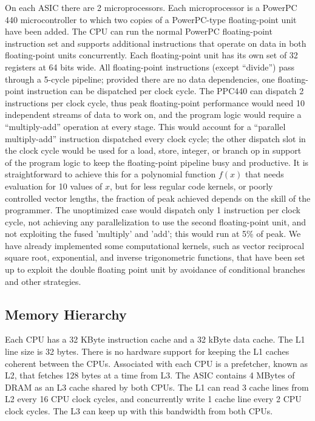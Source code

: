 \documentclass[doublespacing]{elsart}
\begin{document}
On each ASIC there are 2 microprocessors. Each microprocessor is a
PowerPC 440 microcontroller to which two copies of a PowerPC-type
floating-point unit have been added. The CPU can run the normal
PowerPC floating-point instruction set and supports additional
instructions that operate on data in both floating-point units
concurrently. Each floating-point unit has its own set of 32 registers
at 64 bits wide.  All floating-point instructions (except ``divide'')
pass through a 5-cycle pipeline; provided there are no data
dependencies, one floating-point instruction can be dispatched per
clock cycle.  The PPC440 can dispatch 2 instructions per clock cycle,
thus peak floating-point performance would need 10 independent streams
of data to work on, and the program logic would require a
``multiply-add'' operation at every stage. This would account for a
``parallel multiply-add'' instruction dispatched every clock cycle; the
other dispatch slot in the clock cycle would be used for a load,
store, integer, or branch op in support of the program logic to keep
the floating-point pipeline busy and productive.  It is
straightforward to achieve this for a polynomial function $f(x)$ that
needs evaluation for 10 values of $x$, but for less regular code
kernels, or poorly controlled vector lengths, the fraction of peak
achieved depends on the skill of the programmer.  The unoptimized case
would dispatch only 1 instruction per clock cycle, not achieving any
parallelization to use the second floating-point unit, and not
exploiting the fused 'multiply' and 'add'; this would run at 5\% of
peak.  We have already implemented some computational kernels, such as
vector reciprocal square root, exponential, and inverse trigonometric
functions, that have been set up to exploit the double floating point
unit by avoidance of conditional branches and other strategies.

\subsection{Memory Hierarchy}

Each CPU has a 32 KByte instruction cache and a 32 kByte data
cache. The L1 line size is 32 bytes. There is no hardware support for
keeping the L1 caches coherent between the CPUs.  Associated with each
CPU is a prefetcher, known as L2, that fetches 128 bytes at a time
from L3. The ASIC contains 4 MBytes of DRAM as an L3 cache shared by
both CPUs.  The L1 can read 3 cache lines from L2 every 16 CPU clock
cycles, and concurrently write 1 cache line every 2 CPU clock
cycles. The L3 can keep up with this bandwidth from both CPUs.
\end{document}
